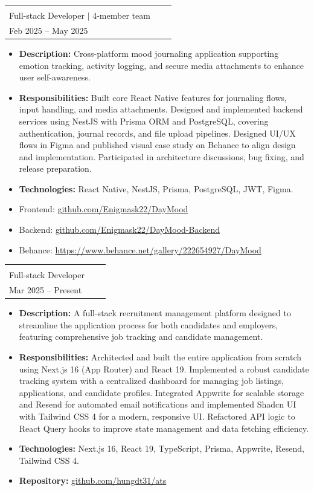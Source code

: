 \documentclass[a4paper,12pt]{article}
\makeatletter
\newenvironment{joblong}[2]
    {
    \begin{tabularx}{\linewidth}{@{}l X r@{}}
    \textbf{#1} & \hfill &  #2 \\[3.75pt]
    \end{tabularx}
    \begin{minipage}[t]{\linewidth}
    \begin{itemize}[nosep,after=\strut, leftmargin=1em, itemsep=3pt,label=--]
    }
    {
    \end{itemize}
    \end{minipage}    
    }
\makeatother
\begin{document}
\begin{joblong}{{\shortstack[l]{Day Mood - Mood Journaling App\\ Full-stack Developer $|$ 4-member team}}}{{\shortstack[r]{Mobile Application Development\\ Feb 2025 -- May 2025}}}
\item \textbf{Description:} Cross-platform mood journaling application supporting emotion tracking, activity logging, and secure media attachments to enhance user self-awareness.
\item \textbf{Responsibilities:} Built core React Native features for journaling flows, input handling, and media attachments. Designed and implemented backend services using NestJS with Prisma ORM and PostgreSQL, covering authentication, journal records, and file upload pipelines. Designed UI/UX flows in Figma and published visual case study on Behance to align design and implementation. Participated in architecture discussions, bug fixing, and release preparation.
\item \textbf{Technologies:} React Native, NestJS, Prisma, PostgreSQL, JWT, Figma.
\item Frontend: \href{https://github.com/Enigmask22/DayMood}{github.com/Enigmask22/DayMood}
\item Backend: \href{https://github.com/Enigmask22/DayMood-Backend}{github.com/Enigmask22/DayMood-Backend}
\item Behance: \href{https://www.behance.net/gallery/222654927/DayMood}{https://www.behance.net/gallery/222654927/DayMood}
\end{joblong}

\begin{joblong}{{\shortstack[l]{ATS -- Applicant Tracking System\\ Full-stack Developer}}}{{\shortstack[r]{Personal Project\\ Mar 2025 -- Present}}}
\item \textbf{Description:} A full-stack recruitment management platform designed to streamline the application process for both candidates and employers, featuring comprehensive job tracking and candidate management.
\item \textbf{Responsibilities:} Architected and built the entire application from scratch using Next.js 16 (App Router) and React 19. Implemented a robust candidate tracking system with a centralized dashboard for managing job listings, applications, and candidate profiles. Integrated Appwrite for scalable storage and Resend for automated email notifications and implemented Shadcn UI with Tailwind CSS 4 for a modern, responsive UI. Refactored API logic to React Query hooks to improve state management and data fetching efficiency.
\item \textbf{Technologies:} Next.js 16, React 19, TypeScript, Prisma, Appwrite, Resend, Tailwind CSS 4.
\item \textbf{Repository:} \href{https://github.com/hungdt31/ats}{github.com/hungdt31/ats}
\end{joblong}
\end{document}
